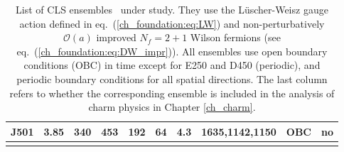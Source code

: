\begin{longtable}{c c c c c c c c c c}
    J501 & 3.85 & 340 & 453 & 192 & 64 & 4.3 & 1635,1142,1150 & OBC & no\\
    \bottomrule
    \caption{List of CLS ensembles~\citep{Bruno:2014jqa,Mohler:2017wnb} under study. They use the Lüscher-Weisz gauge action defined in eq.~(\ref{ch_foundation:eq:LW}) and non-perturbatively $\mathcal{O}(a)$ improved $N_f=2+1$ Wilson fermions (see eq.~(\ref{ch_foundation:eq:DW_impr})). All ensembles use open boundary conditions (OBC) in time except for E250 and D450 (periodic), and periodic boundary conditions for all spatial directions. The last column refers to whether the corresponding ensemble is included in the analysis of charm physics in Chapter \ref{ch_charm}.}
\end{longtable}


